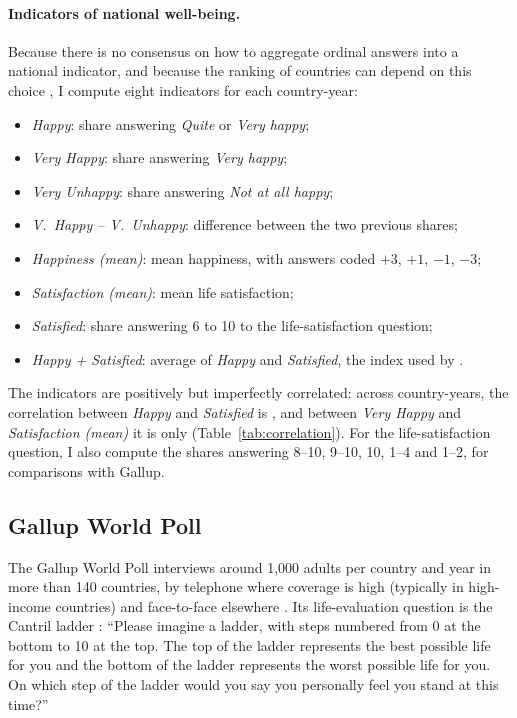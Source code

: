 \documentclass[11pt]{article}
\begin{document}
\paragraph{Indicators of national well-being.}
Because there is no consensus on how to aggregate ordinal answers into a national indicator, and because the ranking of countries can depend on this choice \citep{bond_sad_2019}, I compute eight indicators for each country-year:
\begin{itemize}
    \item \textit{Happy}: share answering \textit{Quite} or \textit{Very happy};
    \item \textit{Very Happy}: share answering \textit{Very happy};
    \item \textit{Very Unhappy}: share answering \textit{Not at all happy};
    \item \textit{V.~Happy -- V.~Unhappy}: difference between the two previous shares;
    \item \textit{Happiness (mean)}: mean happiness, with answers coded $+3$, $+1$, $-1$, $-3$;
    \item \textit{Satisfaction (mean)}: mean life satisfaction;
    \item \textit{Satisfied}: share answering 6 to 10 to the life-satisfaction question;
    \item \textit{Happy + Satisfied}: average of \textit{Happy} and \textit{Satisfied}, the index used by \citet{inglehart_genes_2000}.
\end{itemize}
The indicators are positively but imperfectly correlated: across country-years, the correlation between \textit{Happy} and \textit{Satisfied} is \corHappySatisfied, and between \textit{Very Happy} and \textit{Satisfaction (mean)} it is only \corVeryHappySatisfiedMean (Table~\ref{tab:correlation}). For the life-satisfaction question, I also compute the shares answering 8--10, 9--10, 10, 1--4 and 1--2, for comparisons with Gallup. 

\subsection{Gallup World Poll}\label{subsec:gallup}
The Gallup World Poll interviews around 1,000 adults per country and year in more than 140 countries, by telephone where coverage is high (typically in high-income countries) and face-to-face elsewhere \citep{gallup_methodology_2022}. Its life-evaluation question is the Cantril ladder \citep{cantril_pattern_1965}: ``Please imagine a ladder, with steps numbered from 0 at the bottom to 10 at the top. The top of the ladder represents the best possible life for you and the bottom of the ladder represents the worst possible life for you. On which step of the ladder would you say you personally feel you stand at this time?''
\end{document}
